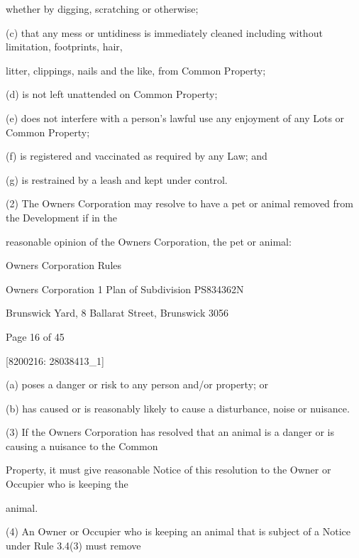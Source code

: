 \documentclass{article}
\begin{document}
{\fontsize{10.02}{1}whether by digging, scratching or otherwise; }

{\fontsize{9.962}{1}(c) that any mess or untidiness is immediately cleaned including without limitation, footprints, hair, }

{\fontsize{10.02}{1}litter, clippings, nails and the like,  from Common Property; }

{\fontsize{9.962}{1}(d) is not left unattended on Common Property; }

{\fontsize{9.962}{1}(e) does not interfere with a person’s lawful use any enjoyment of any Lots or Common Property; }

{\fontsize{9.962}{1}(f) is registered and vaccinated as required by any Law; and }

{\fontsize{9.962}{1}(g) is restrained by a leash and kept under control. }

{\fontsize{9.962}{1}(2) The Owners Corporation may resolve to have a pet or animal removed from the Development if in the }

{\fontsize{10.02}{1}reasonable opinion of the Owners Corporation, the pet or animal: }

\newpage





{\fontsize{9}{1}Owners Corporation Rules }

{\fontsize{9}{1}Owners Corporation 1 Plan of Subdivision PS834362N }

{\fontsize{9}{1}Brunswick Yard, 8 Ballarat Street, Brunswick 3056 }


{\fontsize{9}{1}Page 16  of 45 }



{\fontsize{7.02}{1}[8200216: 28038413\_1] }


{\fontsize{9.962}{1}(a) poses a danger or risk to any person and/or property; or }

{\fontsize{9.962}{1}(b) has caused or is reasonably likely to cause a disturbance, noise or nuisance. }

{\fontsize{9.962}{1}(3) If the Owners Corporation has resolved that an animal is a danger or is causing a nuisance to the Common }

{\fontsize{10.02}{1}Property, it must give reasonable Notice of this resolution to the Owner or Occupier who is keeping the }

{\fontsize{10.02}{1}animal. }

{\fontsize{9.962}{1}(4) An Owner or Occupier who is keeping an animal that is subject of a Notice under Rule 3.4(3) must remove }
\end{document}
